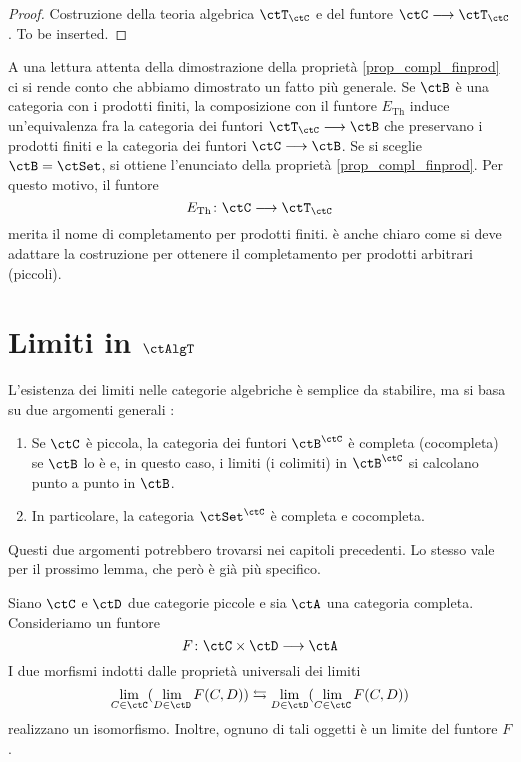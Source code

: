 \begin{proof}
	Costruzione della teoria algebrica \(\ctT_{\ctC}\) e del funtore \(\ctC \fun \ctT_{\ctC}\). To be inserted.
\end{proof}

\begin{remark}\label{oss_compl_finprod}
	A una lettura attenta della dimostrazione della proprietà \ref{prop_compl_finprod} ci si rende conto che abbiamo dimostrato un fatto più
	generale. Se \(\ctB\) è una categoria con i prodotti finiti, la composizione con il funtore \(E_{\mathrm{Th}}\) induce un'equivalenza fra la
	categoria dei funtori \(\ctT_{\ctC} \fun \ctB\) che preservano i prodotti finiti e la categoria dei funtori \(\ctC \fun \ctB\). Se si sceglie
	\(\ctB = \ctSet\), si ottiene l'enunciato della proprietà \ref{prop_compl_finprod}. Per questo motivo, il funtore
	\[
		E_{\mathrm{Th}} \colon \ctC \fun \ctT_{\ctC}
	\]
	merita il nome di completamento per prodotti finiti. è anche chiaro come si deve adattare la costruzione per ottenere il completamento per
	prodotti arbitrari (piccoli).
\end{remark}

\section{Limiti in \(\ctAlgT\)}\label{sec_lim_AlgT}

\begin{warning}\label{caveat_lim_functcat}
	L'esistenza dei limiti nelle categorie algebriche è semplice da stabilire, ma si basa su due argomenti generali :
	\begin{enumerate}
		\item Se \(\ctC\) è piccola, la categoria dei funtori \(\ctB^{\ctC}\) è completa (cocompleta) se \(\ctB\) lo è e, in questo caso, i limiti (i
		      colimiti) in \(\ctB^{\ctC}\) si calcolano punto a punto in \(\ctB\).
		\item In particolare, la categoria \(\ctSet^{\ctC}\) è completa e cocompleta.
	\end{enumerate}
	Questi due argomenti potrebbero trovarsi nei capitoli precedenti. Lo stesso vale per il prossimo lemma, che però è già più specifico.
\end{warning}

\begin{lemma}\label{lemma_Fubini}
	Siano \(\ctC\) e \(\ctD\) due categorie piccole e sia \(\ctA\) una categoria completa. Consideriamo un funtore
	\[
		F \colon \ctC \times \ctD \fun \ctA
	\]
	I due morfismi indotti dalle proprietà universali dei limiti
	\[
		\lim_{C \in \ctC}(\lim_{D \in \ctD}F(C,D)) \leftrightarrows \lim_{D \in \ctD}(\lim_{C \in \ctC}F(C,D))
	\]
	realizzano un isomorfismo. Inoltre, ognuno di tali oggetti è un limite del funtore \(F\).
\end{lemma}

